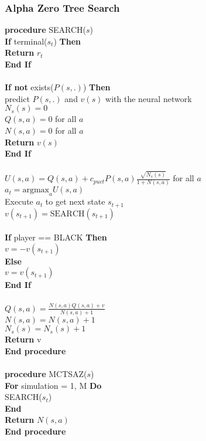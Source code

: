 \documentclass{article}
\begin{document}
\subsubsection{Alpha Zero Tree Search}
\textbf{procedure} SEARCH($s$) \\
\indent \textbf{If} terminal($s_t$) \textbf{Then} \\
\indent \indent \textbf{Return} $r_t$ \\
\indent \textbf{End If} \\
\\
\indent \textbf{If not} exists($P(s, .)$) \textbf{Then} \\
\indent \indent predict $P(s, .)$ and $v(s)$ with the neural network \\
\indent \indent $N_s(s) = 0$ \\
\indent \indent $Q(s, a) = 0$ for all $a$ \\
\indent \indent $N(s, a) = 0$ for all $a$ \\
\indent \indent \textbf{Return} $v(s)$ \\
\indent \textbf{End If} \\
\\
\indent $U(s,a) = Q(s,a) + c_{puct} P(s,a) \frac{\sqrt{N_s(s)}}{1 + N(s,a)}$ for all $a$ \\
\indent $a_t = \text{argmax}_a U(s,a)$ \\
\indent Execute $a_t$ to get next state $s_{t+1}$ \\
\indent $v(s_{t+1}) = \text{SEARCH}(s_{t+1})$ \\
\\
\indent \textbf{If} player == BLACK \textbf{Then} \\
\indent \indent $v = -v(s_{t+1})$ \\
\indent \textbf{Else} \\
\indent \indent $v = v(s_{t+1})$ \\
\indent \textbf{End If} \\
\\
\indent $Q(s,a) = \frac{N(s,a) Q(s,a) + v}{N(s,a) + 1}$ \\
\indent $N(s,a) = N(s,a) + 1$ \\
\indent $N_s(s) = N_s(s) + 1$ \\
\indent \textbf{Return} v \\
\textbf{End procedure} \\
\\
\textbf{procedure} MCTSAZ($s$) \\
\indent \textbf{For} simulation = 1, M \textbf{Do} \\
\indent \indent SEARCH($s_t$) \\
\indent \textbf{End} \\
\indent \textbf{Return} $N(s,a)$\\
\textbf{End procedure} \\
\end{document}
